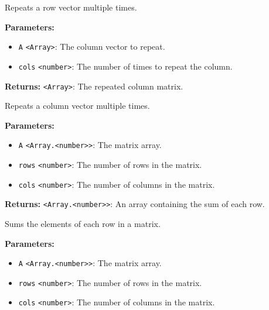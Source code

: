\documentclass[12pt,a4paper]{article}
\begin{document}
\noindent Repeats a row vector multiple times.

\vspace{5mm}
\noindent {}


\noindent \textbf{Parameters:}
\begin{itemize}
  \item \texttt{A} \texttt{<Array>}: The column vector to repeat.
  \item \texttt{cols} \texttt{<number>}: The number of times to repeat the column.
\end{itemize}

\noindent \textbf{Returns:} \texttt{<Array>}: The repeated column matrix.

\noindent Repeats a column vector multiple times.

\vspace{5mm}
\noindent {}


\noindent \textbf{Parameters:}
\begin{itemize}
  \item \texttt{A} \texttt{<Array.<number>>}: The matrix array.
  \item \texttt{rows} \texttt{<number>}: The number of rows in the matrix.
  \item \texttt{cols} \texttt{<number>}: The number of columns in the matrix.
\end{itemize}

\noindent \textbf{Returns:} \texttt{<Array.<number>>}: An array containing the sum of each row.

\noindent Sums the elements of each row in a matrix.

\vspace{5mm}
\noindent {}


\noindent \textbf{Parameters:}
\begin{itemize}
  \item \texttt{A} \texttt{<Array.<number>>}: The matrix array.
  \item \texttt{rows} \texttt{<number>}: The number of rows in the matrix.
  \item \texttt{cols} \texttt{<number>}: The number of columns in the matrix.
\end{itemize}
\end{document}
